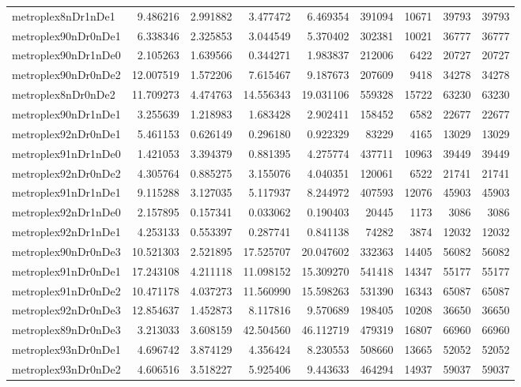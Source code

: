 \documentclass[../../../thesis.tex]{subfiles}
\begin{document}
\begin{longtable}{|l|r|r|r|r|r|r|r|r|}
metroplex8nDr1nDe1 & 9.486216 & 2.991882 & 3.477472 & 6.469354 & 391094 & 10671 & 39793 & 39793 \\
metroplex90nDr0nDe1 & 6.338346 & 2.325853 & 3.044549 & 5.370402 & 302381 & 10021 & 36777 & 36777 \\
metroplex90nDr1nDe0 & 2.105263 & 1.639566 & 0.344271 & 1.983837 & 212006 & 6422 & 20727 & 20727 \\
metroplex90nDr0nDe2 & 12.007519 & 1.572206 & 7.615467 & 9.187673 & 207609 & 9418 & 34278 & 34278 \\
metroplex8nDr0nDe2 & 11.709273 & 4.474763 & 14.556343 & 19.031106 & 559328 & 15722 & 63230 & 63230 \\
metroplex90nDr1nDe1 & 3.255639 & 1.218983 & 1.683428 & 2.902411 & 158452 & 6582 & 22677 & 22677 \\
metroplex92nDr0nDe1 & 5.461153 & 0.626149 & 0.296180 & 0.922329 & 83229 & 4165 & 13029 & 13029 \\
metroplex91nDr1nDe0 & 1.421053 & 3.394379 & 0.881395 & 4.275774 & 437711 & 10963 & 39449 & 39449 \\
metroplex92nDr0nDe2 & 4.305764 & 0.885275 & 3.155076 & 4.040351 & 120061 & 6522 & 21741 & 21741 \\
metroplex91nDr1nDe1 & 9.115288 & 3.127035 & 5.117937 & 8.244972 & 407593 & 12076 & 45903 & 45903 \\
metroplex92nDr1nDe0 & 2.157895 & 0.157341 & 0.033062 & 0.190403 & 20445 & 1173 & 3086 & 3086 \\
metroplex92nDr1nDe1 & 4.253133 & 0.553397 & 0.287741 & 0.841138 & 74282 & 3874 & 12032 & 12032 \\
metroplex90nDr0nDe3 & 10.521303 & 2.521895 & 17.525707 & 20.047602 & 332363 & 14405 & 56082 & 56082 \\
metroplex91nDr0nDe1 & 17.243108 & 4.211118 & 11.098152 & 15.309270 & 541418 & 14347 & 55177 & 55177 \\
metroplex91nDr0nDe2 & 10.471178 & 4.037273 & 11.560990 & 15.598263 & 531390 & 16343 & 65087 & 65087 \\
metroplex92nDr0nDe3 & 12.854637 & 1.452873 & 8.117816 & 9.570689 & 198405 & 10208 & 36650 & 36650 \\
metroplex89nDr0nDe3 & 3.213033 & 3.608159 & 42.504560 & 46.112719 & 479319 & 16807 & 66960 & 66960 \\
metroplex93nDr0nDe1 & 4.696742 & 3.874129 & 4.356424 & 8.230553 & 508660 & 13665 & 52052 & 52052 \\
metroplex93nDr0nDe2 & 4.606516 & 3.518227 & 5.925406 & 9.443633 & 464294 & 14937 & 59037 & 59037 \\

\end{longtable}
\end{document}
